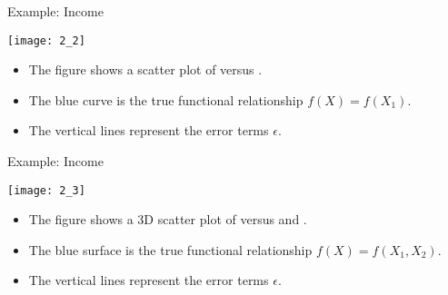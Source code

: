\documentclass[mathserif, aspectratio=169]{beamer}
\begin{document}
\begin{frame}{Example: Income}
	\vspace{-5mm}
	\begin{center}
		\texttt{[image: 2\_2]}
	\end{center}
	\vspace{-5mm}
	\begin{itemize}
		\item The figure shows a scatter plot of  versus .
		\item The blue curve is the true functional relationship $f(X) =f(X_1)$.
		\item The vertical lines represent the error terms $\epsilon$.
	\end{itemize}
\end{frame}

\begin{frame}{Example: Income}
	\vspace{-5mm}
	\begin{center}
		\texttt{[image: 2\_3]}
	\end{center}
	\vspace{-5mm}
	\begin{itemize}
		\item The figure shows a 3D scatter plot of  versus 
			and .
		\item The blue surface is the true functional relationship $f(X) = f(X_1, X_2)$.
		\item The vertical lines represent the error terms $\epsilon$.
	\end{itemize}
\end{frame}
\end{document}
